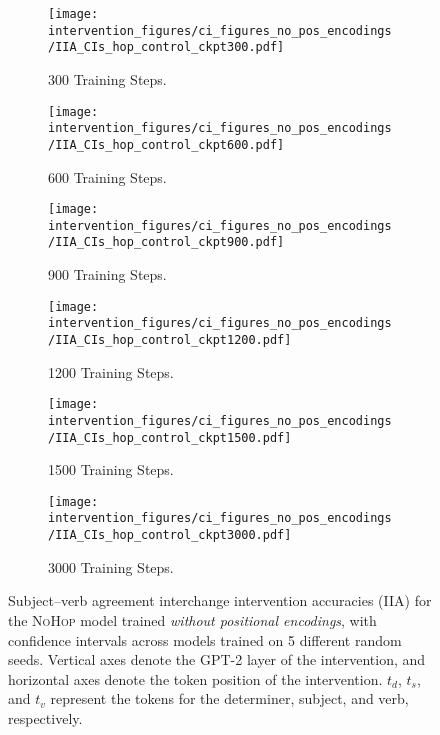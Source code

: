 \documentclass[11pt]{article}
\begin{document}
\begin{figure*}
    \centering
     \begin{subfigure}{0.3\textwidth}
         \centering
         \texttt{[image: intervention\_figures/ci\_figures\_no\_pos\_encodings/IIA\_CIs\_hop\_control\_ckpt300.pdf]}
         \caption{300 Training Steps.}
     \end{subfigure}
     \begin{subfigure}{0.3\textwidth}
         \centering
         \texttt{[image: intervention\_figures/ci\_figures\_no\_pos\_encodings/IIA\_CIs\_hop\_control\_ckpt600.pdf]}
         \caption{600 Training Steps.}
     \end{subfigure}
     \begin{subfigure}{0.3\textwidth}
         \centering
         \texttt{[image: intervention\_figures/ci\_figures\_no\_pos\_encodings/IIA\_CIs\_hop\_control\_ckpt900.pdf]}
         \caption{900 Training Steps.}
     \end{subfigure}
     \begin{subfigure}{0.3\textwidth}
         \centering
         \texttt{[image: intervention\_figures/ci\_figures\_no\_pos\_encodings/IIA\_CIs\_hop\_control\_ckpt1200.pdf]}
         \caption{1200 Training Steps.}
     \end{subfigure}
     \begin{subfigure}{0.3\textwidth}
         \centering
         \texttt{[image: intervention\_figures/ci\_figures\_no\_pos\_encodings/IIA\_CIs\_hop\_control\_ckpt1500.pdf]}
         \caption{1500 Training Steps.}
     \end{subfigure}
     \begin{subfigure}{0.3\textwidth}
         \centering
         \texttt{[image: intervention\_figures/ci\_figures\_no\_pos\_encodings/IIA\_CIs\_hop\_control\_ckpt3000.pdf]}
         \caption{3000 Training Steps.}
     \end{subfigure}
    \caption{Subject--verb agreement interchange intervention accuracies (IIA) for the \textsc{NoHop} model trained \emph{without positional encodings}, with confidence intervals across models trained on 5 different random seeds. Vertical axes denote the GPT-2 layer of the intervention, and horizontal axes denote the token position of the intervention. $t_d$, $t_s$, and $t_v$ represent the tokens for the determiner, subject, and verb, respectively.}
    \label{fig:iia_ci_hop_control_no_pos_encodings}
\end{figure*}
\end{document}
